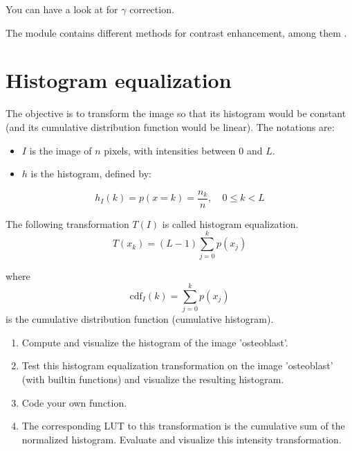 \begin{mcomment}
\begin{mremark}
You can have a look at  for $\gamma$ correction.
\end{mremark}
\end{mcomment}

\begin{pcomment}
\begin{premark}
The module  contains different methods for contrast enhancement, among them .
\end{premark}
\end{pcomment}


\section{Histogram equalization}
The objective is to transform the image so that its histogram would be constant (and its cumulative distribution function would be linear).
The notations are:
\begin{itemize}  \item $I$ is the image of $n$ pixels, with intensities between $0$ and $L$.
  \item $h$ is the histogram, defined by:
 \end{itemize}

$${\displaystyle h_I(k)=p(x=k)={\frac {n_{k}}{n}},\quad 0\leq k<L}$$

The following transformation $T(I)$ is called histogram equalization.
$${\displaystyle T(x_k)=(L-1)\sum _{j=0}^{k}p(x_{j})} $$


 where $${\displaystyle \mathrm{cdf}_I(k)=\sum _{j=0}^{k}p(x_{j})} $$ is the cumulative distribution function (cumulative histogram). 

\begin{qbox}
\begin{enumerate}
	\item Compute and visualize the histogram of the image 'osteoblast'.
	\item Test this histogram equalization transformation on the image 'osteoblast' (with builtin functions) and visualize the resulting histogram.
	\item Code your own function.
	\item The corresponding LUT to this transformation is the cumulative sum of the normali\-zed his\-to\-gram. Evaluate and visualize this intensity transformation.
\end{enumerate}
\end{qbox}

